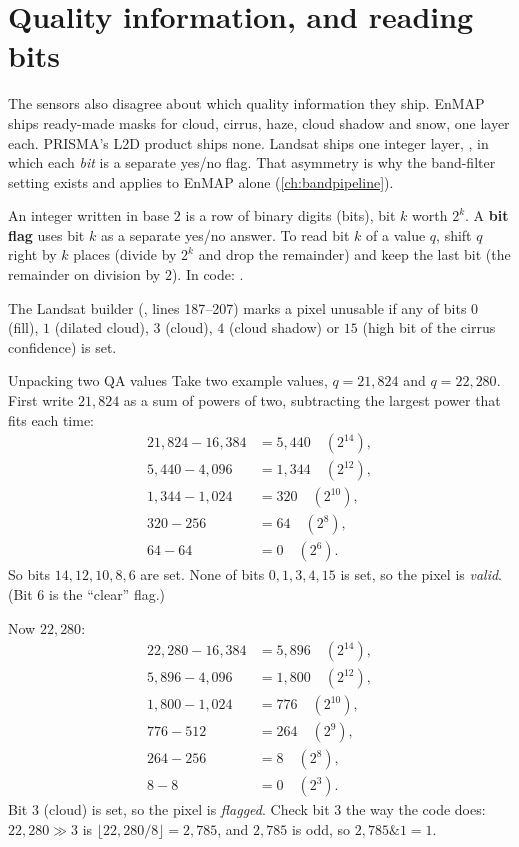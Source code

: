 \section{Quality information, and reading bits}\label{sec:sensors:quality}

The sensors also disagree about which quality information they ship. EnMAP ships ready-made masks
for cloud, cirrus, haze, cloud shadow and snow, one  layer each. PRISMA's L2D
product ships none. Landsat ships one integer layer, , in which each \emph{bit}
is a separate yes/no flag. That asymmetry is why the band-filter setting
 exists and applies to EnMAP alone (\cref{ch:bandpipeline}).

\begin{definition}
An integer written in base $2$ is a row of binary digits (bits), bit $k$ worth $2^k$. A
\textbf{bit flag} uses bit $k$ as a separate yes/no answer. To read bit $k$ of a value $q$, shift
$q$ right by $k$ places (divide by $2^k$ and drop the remainder) and keep the last bit (the
remainder on division by $2$). In code: .
\end{definition}

The Landsat builder (, lines
187--207) marks a pixel unusable if any of bits $0$ (fill), $1$ (dilated cloud), $3$ (cloud),
$4$ (cloud shadow) or $15$ (high bit of the cirrus confidence) is set.

\begin{worked}[label={we:sensors:qa}]{Unpacking two QA values}
Take two example values\tagA, $q = 21{,}824$ and $q = 22{,}280$. First write $21{,}824$ as a sum of
powers of two, subtracting the largest power that fits each time:
\begin{align*}
21{,}824 - 16{,}384 &= 5{,}440 \quad (2^{14}),\\
5{,}440 - 4{,}096 &= 1{,}344 \quad (2^{12}),\\
1{,}344 - 1{,}024 &= 320 \quad (2^{10}),\\
320 - 256 &= 64 \quad (2^{8}),\\
64 - 64 &= 0 \quad (2^{6}).
\end{align*}
So bits $14, 12, 10, 8, 6$ are set. None of bits $0, 1, 3, 4, 15$ is set, so the pixel is
\emph{valid}. (Bit $6$ is the ``clear'' flag.)

Now $22{,}280$:
\begin{align*}
22{,}280 - 16{,}384 &= 5{,}896 \quad (2^{14}),\\
5{,}896 - 4{,}096 &= 1{,}800 \quad (2^{12}),\\
1{,}800 - 1{,}024 &= 776 \quad (2^{10}),\\
776 - 512 &= 264 \quad (2^{9}),\\
264 - 256 &= 8 \quad (2^{8}),\\
8 - 8 &= 0 \quad (2^{3}).
\end{align*}
Bit $3$ (cloud) is set, so the pixel is \emph{flagged}. Check bit $3$ the way the code does:
$22{,}280 \gg 3$ is $\lfloor 22{,}280/8 \rfloor = 2{,}785$, and $2{,}785$ is odd, so
$2{,}785 \mathbin{\&} 1 = 1$.
\end{worked}

